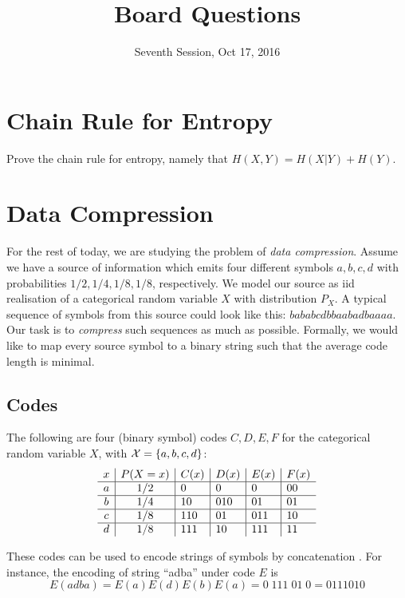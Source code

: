 \documentclass[11p,a4paper]{article}
\title{Board Questions}
\date{Seventh Session, Oct 17, 2016}
\begin{document}
\maketitle

\section{Chain Rule for Entropy}
Prove the chain rule for entropy, namely that $H(X,Y)=H(X|Y)+H(Y)$.

\section{Data Compression}
For the rest of today, we are studying the problem of \emph{data
  compression}. Assume we have a source of information which emits
four different symbols $a,b,c,d$ with probabilities $1/2,1/4,1/8,1/8$,
respectively. We model our source as iid realisation of a
categorical random variable $X$ with distribution $P_X$. A typical
sequence of symbols from this source could look like this: $bababcdbbaabadbaaaa$.
Our task is to \emph{compress} such sequences as much as
possible. Formally, we would like to map every source symbol to a
binary string such that the average code length is minimal.


\subsection{Codes} \label{sec:codes}
The following are four (binary symbol) codes $C,D,E, F$ for the
categorical random variable $X$, with ${\cal X} = \{a,b,c,d\}$:
\[
\begin{array}{c | c | l | l | l | l}
x & P(X=x) & C(x) & D(x) & E(x) & F(x)\\
\hline
a & 1/2 & 0   & 0   & 0   & 00 \\
\hline
b & 1/4 & 10  & 010 & 01  & 01\\
\hline
c & 1/8 & 110 & 01  & 011 & 10 \\
\hline
d & 1/8 & 111 & 10  & 111 & 11 \\
\end{array}
\]

These codes can be used to encode strings of symbols by concatenation . For instance,
the encoding of string ``adba'' under code $E$ is
\[
E(adba) = E(a) E(d) E(b) E(a) = 0 \; 111 \; 01 \; 0 = 0111010
\]
\end{document}
